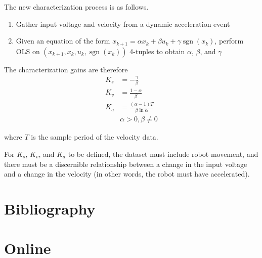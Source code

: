 \documentclass[10pt,conference,compsoc]{IEEEtran}
\DeclareMathOperator{\sgn}{sgn}
\begin{document}
The new characterization process is as follows.
\begin{enumerate}
  \item Gather input voltage and velocity from a dynamic acceleration event
  \item Given an equation of the form
    $x_{k+1} = \alpha x_k + \beta u_k + \gamma\sgn(x_k)$, perform OLS on
    $(x_{k+1}, x_k, u_k, \sgn(x_k))$ 4-tuples to obtain $\alpha$, $\beta$, and
    $\gamma$
\end{enumerate}

The characterization gains are therefore
\begin{align}
  K_s &= -\frac{\gamma}{\beta} \\
  K_v &= \frac{1 - \alpha}{\beta} \\
  K_a &= \frac{(\alpha - 1) T}{\beta \ln\alpha} \\
      &\alpha > 0, \beta \neq 0 \nonumber
\end{align}

where $T$ is the sample period of the velocity data.

For $K_s$, $K_v$, and $K_a$ to be defined, the dataset must include robot
movement, and there must be a discernible relationship between a change in the
input voltage and a change in the velocity (in other words, the robot must have
accelerated).

\section{Bibliography}

\section*{Online}
\printbibliography[heading=bibempty,type=online]
\end{document}
